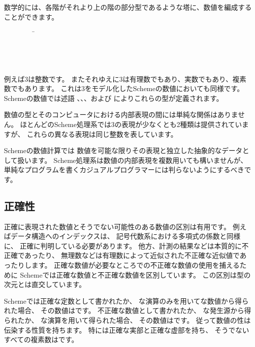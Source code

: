 \vest 数学的には、各階がそれより上の階の部分型であるような塔に、数値を編成することができます。
\begin{tabbing}
\ \ \ \ \ \ \ \ \ \= \\
\>  \\
\>  \\
\>  \\
\>  
\end{tabbing}

例えば3は整数です。
またそれゆえに3は有理数でもあり、実数でもあり、複素数でもあります。
これは3をモデル化したSchemeの数値においても同様です。
Schemeの数値では述語
、、、および
によりこれらの型が定義されます。

数値の型とそのコンピュータにおける内部表現の間には単純な関係はありません。
ほとんどのScheme処理系では3の表現が少なくとも2種類は提供されていますが、
これらの異なる表現は同じ整数を表しています。

Schemeの数値計算では
数値を可能な限りその表現と独立した抽象的なデータとして扱います。
Scheme処理系は数値の内部表現を複数用いても構いませんが、
単純なプログラムを書くカジュアルプログラマーには判らないようにするべきです。

\subsection{正確性}

 \label{exactly}

正確に表現された数値とそうでない可能性のある数値の区別は有用です。
例えばデータ構造へのインデックスは、
記号代数系における多項式の係数と同様に、
正確に判明している必要があります。
他方、計測の結果などは本質的に不正確であったり、
無理数などは有理数によって近似された不正確な近似値であったりします。
正確な数値が必要なところでの不正確な数値の使用を捕えるために
Schemeでは正確な数値と不正確な数値を区別しています。
この区別は型の次元とは直交しています。

Schemeでは正確な定数として書かれたか、
な演算のみを用いてな数値から得られた場合、
その数値はです。
不正確な数値として書かれたか、
な発生源から得られたか、
な演算を用いて得られた場合、
その数値はです。
従って数値の性は伝染する性質を持ちます。
特には正確な実部と正確な虚部を持ち、
そうでないすべての複素数はです。

